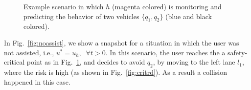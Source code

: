 \documentclass[letterpaper, 10 pt, conference]{ieeeconf}  %
\begin{document}
\begin{figure}[ht!]
	\centering
	\vspace{-5pt}
	\caption{Example scenario in which $h$ (magenta colored) is monitoring and predicting the behavior of two vehicles $\{q_1,q_2\}$ (blue and black colored).}
	\label{fig:critpt}
	\vspace{-5pt}
\end{figure}



In Fig.~\ref{fig:noassist}, we show a snapshot for a situation in which the user was not assisted, i.e., $u^*=u_h, \;\;\forall t>0$. In this scenario, the user reaches the a safety-critical point as in Fig.~\ref{fig:critpt}, and decides to avoid $q_2$, by moving to the left lane $l_1$, where the risk is high (as shown in Fig.~\ref{fig:critrd}). As a result a collision happened in this case.
\end{document}
